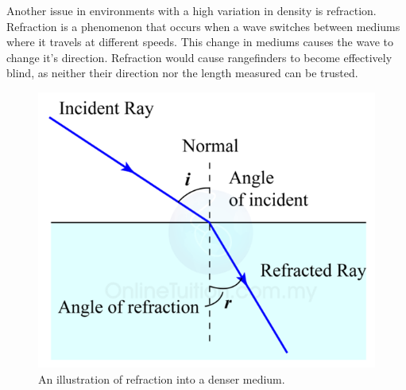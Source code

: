 Another issue in environments with a high variation in density is refraction. Refraction is a phenomenon that occurs when a wave switches between mediums where it travels at different speeds. This change in mediums causes the wave to change it's direction. \cite{snell} Refraction would cause rangefinders to become effectively blind, as neither their direction nor the length measured can be trusted.
\begin{figure}[H]
	\centering
	\includegraphics[width=.4\linewidth]{images/refraction.png}
        \caption{An illustration of refraction into a denser medium.}
        \label{fig:refractionIMG}
\end{figure}

